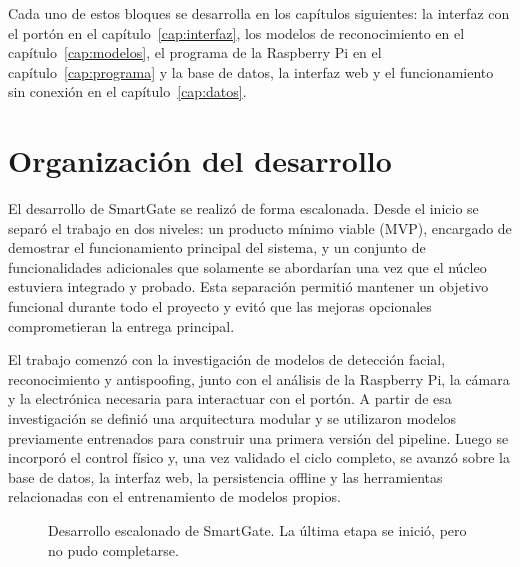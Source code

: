 Cada uno de estos bloques se desarrolla en los capítulos siguientes: la interfaz con el portón en el capítulo~\ref{cap:interfaz}, los modelos de reconocimiento en el capítulo~\ref{cap:modelos}, el programa de la Raspberry Pi en el capítulo~\ref{cap:programa} y la base de datos, la interfaz web y el funcionamiento sin conexión en el capítulo~\ref{cap:datos}.

\section{Organización del desarrollo}

El desarrollo de SmartGate se realizó de forma escalonada. Desde el inicio se separó el trabajo en dos niveles: un producto mínimo viable (MVP), encargado de demostrar el funcionamiento principal del sistema, y un conjunto de funcionalidades adicionales que solamente se abordarían una vez que el núcleo estuviera integrado y probado. Esta separación permitió mantener un objetivo funcional durante todo el proyecto y evitó que las mejoras opcionales comprometieran la entrega principal.

El trabajo comenzó con la investigación de modelos de detección facial, reconocimiento y antispoofing, junto con el análisis de la Raspberry Pi, la cámara y la electrónica necesaria para interactuar con el portón. A partir de esa investigación se definió una arquitectura modular y se utilizaron modelos previamente entrenados para construir una primera versión del pipeline. Luego se incorporó el control físico y, una vez validado el ciclo completo, se avanzó sobre la base de datos, la interfaz web, la persistencia offline y las herramientas relacionadas con el entrenamiento de modelos propios.

\begin{figure}[H]
    \centering
    \caption{Desarrollo escalonado de SmartGate. La última etapa se inició, pero no pudo completarse.}
    \label{fig:desarrollo-escalonado}
\end{figure}

